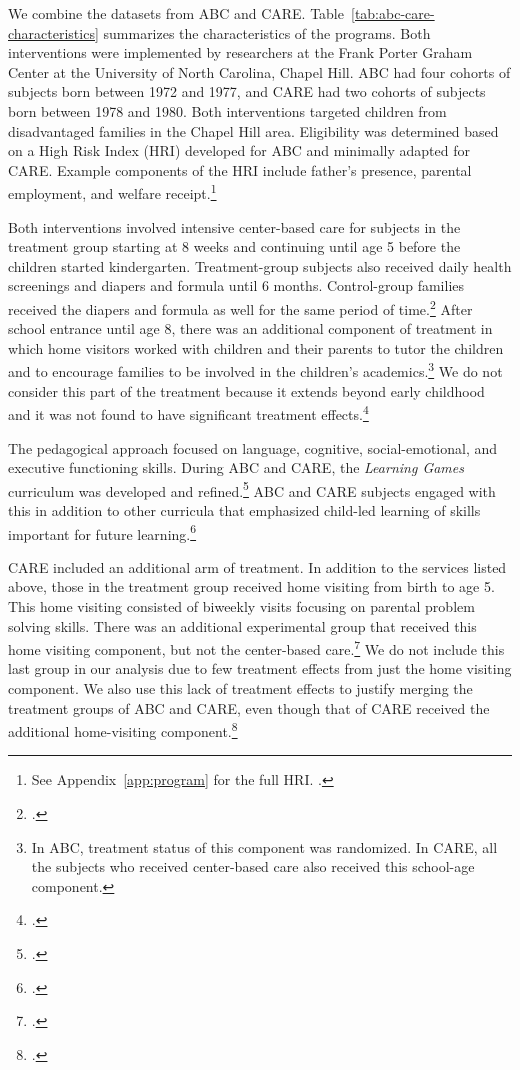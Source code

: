 We combine the datasets from ABC and CARE. Table~\ref{tab:abc-care-characteristics} summarizes the characteristics of the programs. Both interventions were implemented by researchers at the Frank Porter Graham Center at the University of North Carolina, Chapel Hill. ABC had four cohorts of subjects born between 1972 and 1977, and CARE had two cohorts of subjects born between 1978 and 1980. Both interventions targeted children from disadvantaged families in the Chapel Hill area. Eligibility was determined based on a High Risk Index (HRI) developed for ABC and minimally adapted for CARE. Example components of the HRI include father's presence, parental employment, and welfare receipt.\footnote{See Appendix~\ref{app:program} for the full HRI. \citet{Ramey_Smith_1977_AJMD, Wasik_Ramey_etal_1990_CD, Ramey_Campbell_1991_childreninpoverty}.}

Both interventions involved intensive center-based care for subjects in the treatment group starting at 8 weeks and continuing until age 5 before the children started kindergarten. Treatment-group subjects also received daily health screenings and diapers and formula until 6 months. Control-group families received the diapers and formula as well for the same period of time.\footnote{\citet{Wasik_Ramey_etal_1990_CD}.}  After school entrance until age 8, there was an additional component of treatment in which home visitors worked with children and their parents to tutor the children and to encourage families to be involved in the children's academics.\footnote{In ABC, treatment status of this component was randomized. In CARE, all the subjects who received center-based care also received this school-age component.} We do not consider this part of the treatment because it extends beyond early childhood and it was not found to have significant treatment effects.\footnote{\citet{Campbell_Ramey_etal_2002_ADS}.} 

The pedagogical approach focused on language, cognitive, social-emotional, and executive functioning skills. During ABC and CARE, the \textit{Learning Games} curriculum was developed and refined.\footnote{\citet{Sparling_Lewis_1979_BOOKLearninggamesFirstThree}.} ABC and CARE subjects engaged with this in addition to other curricula that emphasized child-led learning of skills important for future learning.\footnote{\citet{Conti_etal_2016_LongTermHealth}.}

CARE included an additional arm of treatment. In addition to the services listed above, those in the treatment group received home visiting from birth to age 5. This home visiting consisted of biweekly visits focusing on parental problem solving skills. There was an additional experimental group that received this home visiting component, but not the center-based care.\footnote{\citet{Wasik_Ramey_etal_1990_CD}.} We do not include this last group in our analysis due to few treatment effects from just the home visiting component. We also use this lack of treatment effects to justify merging the treatment groups of ABC and CARE, even though that of CARE received the additional home-visiting component.\footnote{\citet{ABCCARE_Dataset}.}

